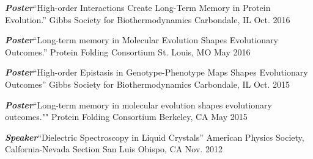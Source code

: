 

\begin{cvpresentations}

  \cvpresentation
    {\textbf{\textit{Poster}}{\enskip\cdotp\enskip}``High-order Interactions Create Long-Term Memory in Protein Evolution.''} %
    {Gibbs Society for Biothermodynamics} %
    {Carbondale, IL} %
    {Oct. 2016} %


  \cvpresentation
    {\textbf{\textit{Poster}}{\enskip\cdotp\enskip}``Long-term memory in Molecular Evolution Shapes Evolutionary Outcomes.''} %
    {Protein Folding Consortium} %
    {St. Louis, MO} %
    {May 2016} %

  \cvpresentation
    {\textbf{\textit{Poster}}{\enskip\cdotp\enskip}``High-order Epistasis in Genotype-Phenotype Maps Shapes Evolutionary Outcomes''} %
    {Gibbs Society for Biothermodynamics} %
    {Carbondale, IL} %
    {Oct. 2015} %

  \cvpresentation
    {\textbf{\textit{Poster}}{\enskip\cdotp\enskip}``Long-term memory in molecular evolution shapes evolutionary outcomes.""} %
    {Protein Folding Consortium} %
    {Berkeley, CA} %
    {May 2015} %

  \cvpresentation
    {\textbf{\textit{Speaker}}{\enskip\cdotp\enskip}``Dielectric Spectroscopy in Liquid Crystals''} %
    {American Physics Society, Calfornia-Nevada Section} %
    {San Luis Obispo, CA} %
    {Nov. 2012} %

\end{cvpresentations}

